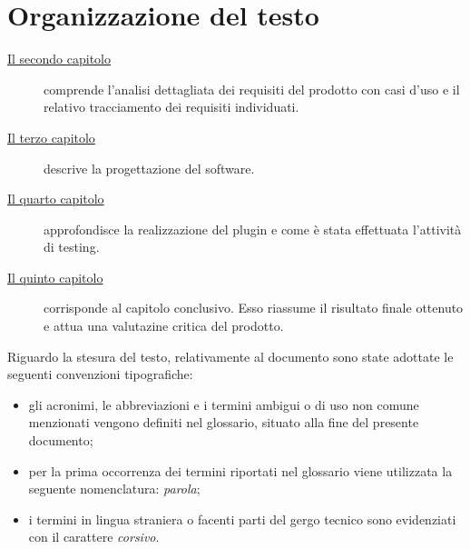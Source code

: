 \section{Organizzazione del testo}

\begin{description}
    \item[{\hyperref[cap:analisi-requisiti]{Il secondo capitolo}}] comprende l'analisi dettagliata dei requisiti del prodotto con casi d'uso e il relativo tracciamento dei requisiti individuati.

    \item[{\hyperref[cap:progettazione]{Il terzo capitolo}}] descrive la progettazione del software.

    \item[{\hyperref[cap:realizzazione-testing]{Il quarto capitolo}}] approfondisce la realizzazione del plugin e come è stata effettuata l'attività di testing.

    \item[{\hyperref[cap:conclusioni]{Il quinto capitolo}}] corrisponde al capitolo conclusivo. Esso riassume il risultato finale ottenuto e attua una valutazine critica del prodotto.

\end{description}

Riguardo la stesura del testo, relativamente al documento sono state adottate le seguenti convenzioni tipografiche:
\begin{itemize}
	\item gli acronimi, le abbreviazioni e i termini ambigui o di uso non comune menzionati vengono definiti nel glossario, situato alla fine del presente documento;
	\item per la prima occorrenza dei termini riportati nel glossario viene utilizzata la seguente nomenclatura: \emph{parola}\glsfirstoccur;
	\item i termini in lingua straniera o facenti parti del gergo tecnico sono evidenziati con il carattere \emph{corsivo}.
\end{itemize}
